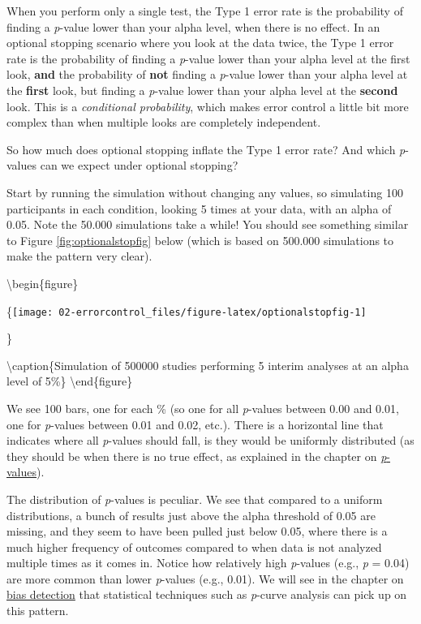 \documentclass[
]{krantz}
\begin{document}
When you perform only a single test, the Type 1 error rate is the probability of finding a \emph{p}-value lower than your alpha level, when there is no effect. In an optional stopping scenario where you look at the data twice, the Type 1 error rate is the probability of finding a \emph{p}-value lower than your alpha level at the first look, \textbf{and} the probability of \textbf{not} finding a \emph{p}-value lower than your alpha level at the \textbf{first} look, but finding a \emph{p}-value lower than your alpha level at the \textbf{second} look. This is a \emph{conditional probability}, which makes error control a little bit more complex than when multiple looks are completely independent.

So how much does optional stopping inflate the Type 1 error rate? And which \emph{p}-values can we expect under optional stopping?

Start by running the simulation without changing any values, so simulating 100 participants in each condition, looking 5 times at your data, with an alpha of 0.05. Note the 50.000 simulations take a while! You should see something similar to Figure \ref{fig:optionalstopfig} below (which is based on 500.000 simulations to make the pattern very clear).

\textbackslash begin\{figure\}

\{\centering \texttt{[image: 02-errorcontrol\_files/figure-latex/optionalstopfig-1]}

\}

\textbackslash caption\{Simulation of 500000 studies performing 5 interim analyses at an alpha level of 5\%\}\label{fig:optionalstopfig}
\textbackslash end\{figure\}

We see 100 bars, one for each \% (so one for all \emph{p}-values between 0.00 and 0.01, one for \emph{p}-values between 0.01 and 0.02, etc.). There is a horizontal line that indicates where all \emph{p}-values should fall, is they would be uniformly distributed (as they should be when there is no true effect, as explained in the chapter on \protect\hyperlink{pvalues}{\emph{p}-values}).

The distribution of \emph{p}-values is peculiar. We see that compared to a uniform distributions, a bunch of results just above the alpha threshold of 0.05 are missing, and they seem to have been pulled just below 0.05, where there is a much higher frequency of outcomes compared to when data is not analyzed multiple times as it comes in. Notice how relatively high \emph{p}-values (e.g., \emph{p} = 0.04) are more common than lower \emph{p}-values (e.g., 0.01). We will see in the chapter on \href{bias}{bias detection} that statistical techniques such as \emph{p}-curve analysis can pick up on this pattern.
\end{document}
